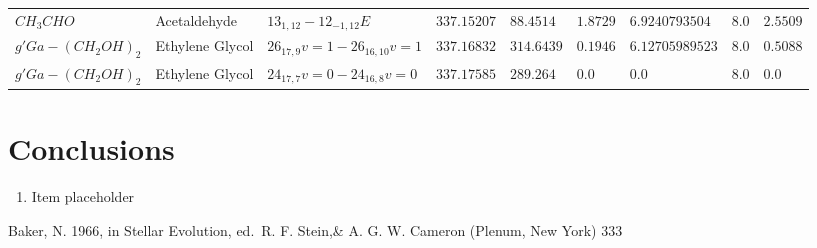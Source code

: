 \documentclass{aa}
\begin{document}
\begin{table}
\begin{tabular}{l l l l l l l l l}
$CH_{3}CHO$ & Acetaldehyde & $13_{1,12}-12_{-1,12}E$ & $337.15207$ & $88.4514$ & $1.8729$ & $6.9240793504$ & $8.0$ & $2.5509$\\
$g'Ga-(CH_{2}OH)_{2}$ & Ethylene Glycol & $26_{17,9}v=1-26_{16,10}v=1$ & $337.16832$ & $314.6439$ & $0.1946$ & $6.12705989523$ & $8.0$ & $0.5088$\\
$g'Ga-(CH_{2}OH)_{2}$ & Ethylene Glycol & $24_{17,7}v=0-24_{16,8}v=0$ & $337.17585$ & $289.264$ & $0.0$ & $0.0$ & $8.0$ & $0.0$\\


    \hline                  
    \end{tabular}
    
\end{table}




\section{Conclusions}

   \begin{enumerate}
   \item Item placeholder
   \end{enumerate}


%
%

\begin{thebibliography}{}

   Baker, N. 1966,
      in Stellar Evolution,
      ed.\ R. F. Stein,\& A. G. W. Cameron
      (Plenum, New York) 333
\end{thebibliography}
\end{document}

